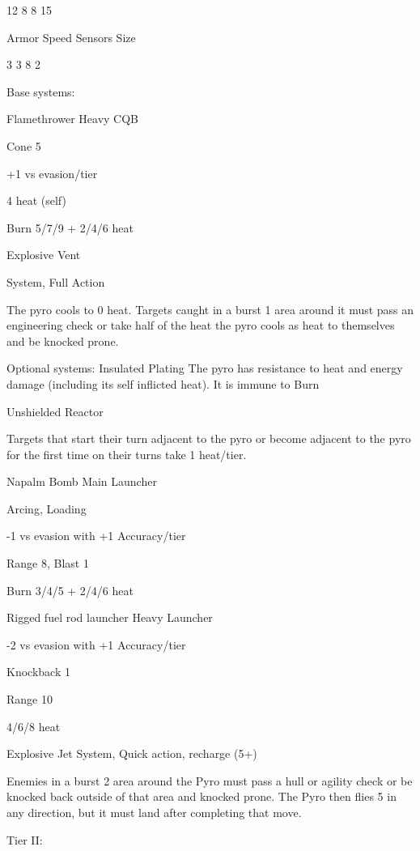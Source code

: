  12         8            8             15 

 Armor      Speed        Sensors       Size 

 3          3            8             2 

Base systems:
 
Flamethrower  
Heavy CQB
 
Cone 5
 
+1 vs evasion/tier
 
4 heat (self)
 
Burn 5/7/9 + 2/4/6 heat
 

Explosive Vent
 
System, Full Action
 
The pyro cools to 0 heat. Targets caught in a burst 1 area around it must pass an engineering  
check or take half of the heat the pyro cools as heat to themselves and be knocked prone.
 

Optional systems:  
Insulated Plating  
The pyro has resistance to heat and energy damage (including its self inflicted heat). It is immune  
to Burn
 

Unshielded Reactor  

                                                                                                           


Targets that start their turn adjacent to the pyro or become adjacent to the pyro for the first time  
on their turns take 1 heat/tier.
 

Napalm Bomb  
Main Launcher
 
Arcing, Loading
 
-1 vs evasion with +1 Accuracy/tier
 
Range 8, Blast 1
 
Burn 3/4/5 + 2/4/6 heat
 

Rigged fuel rod launcher  
Heavy Launcher
 
-2 vs evasion with +1 Accuracy/tier
 
Knockback 1
 
Range 10
 
4/6/8 heat
 

Explosive Jet  
System, Quick action, recharge (5+)
 
Enemies in a burst 2 area around the Pyro must pass a hull or agility check or be knocked back  
outside of that area and knocked prone. The Pyro then flies 5 in any direction, but it must land  
after completing that move.
 

Tier II:
 
